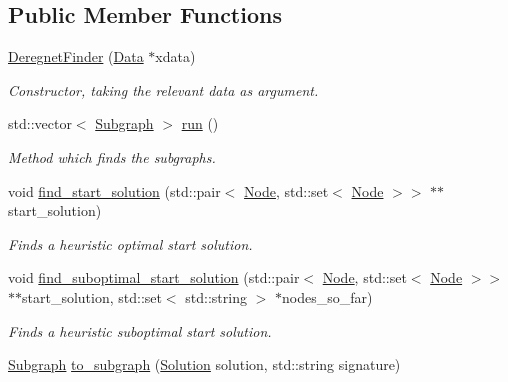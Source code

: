 \subsection*{Public Member Functions}
\begin{DoxyCompactItemize}
\item 
\hyperlink{classderegnet_1_1DeregnetFinder_a5a19a86a0f9f9fa17e8ab625c748d31a}{Deregnet\+Finder} (\hyperlink{avgdrgnt_8cpp_a1d1235306db276e9b36acba1db1509e8}{Data} $\ast$xdata)
\begin{DoxyCompactList}\small\item\em Constructor, taking the relevant data as argument. \end{DoxyCompactList}\item 
std\+::vector$<$ \hyperlink{structderegnet_1_1Subgraph}{Subgraph} $>$ \hyperlink{classderegnet_1_1DeregnetFinder_a1a6119b306b54ff44d8c78f34fc037ab}{run} ()
\begin{DoxyCompactList}\small\item\em Method which finds the subgraphs. \end{DoxyCompactList}\item 
void \hyperlink{classderegnet_1_1DeregnetFinder_a9bca73c631c1ce679b07f1e0664abfa2}{find\+\_\+start\+\_\+solution} (std\+::pair$<$ \hyperlink{namespacederegnet_a744bad34f2de9856d36715a445f027f3}{Node}, std\+::set$<$ \hyperlink{namespacederegnet_a744bad34f2de9856d36715a445f027f3}{Node} $>$$>$ $\ast$$\ast$start\+\_\+solution)
\begin{DoxyCompactList}\small\item\em Finds a heuristic optimal start solution. \end{DoxyCompactList}\item 
void \hyperlink{classderegnet_1_1DeregnetFinder_a85fcde1dddbfd03ffc4ae8d244b4fc72}{find\+\_\+suboptimal\+\_\+start\+\_\+solution} (std\+::pair$<$ \hyperlink{namespacederegnet_a744bad34f2de9856d36715a445f027f3}{Node}, std\+::set$<$ \hyperlink{namespacederegnet_a744bad34f2de9856d36715a445f027f3}{Node} $>$$>$ $\ast$$\ast$start\+\_\+solution, std\+::set$<$ std\+::string $>$ $\ast$nodes\+\_\+so\+\_\+far)
\begin{DoxyCompactList}\small\item\em Finds a heuristic suboptimal start solution. \end{DoxyCompactList}\item 
\hyperlink{structderegnet_1_1Subgraph}{Subgraph} \hyperlink{classderegnet_1_1DeregnetFinder_a681d5e2506f9b6075ab36e742a360328}{to\+\_\+subgraph} (\hyperlink{structderegnet_1_1Solution}{Solution} solution, std\+::string signature)

\end{DoxyCompactItemize}

